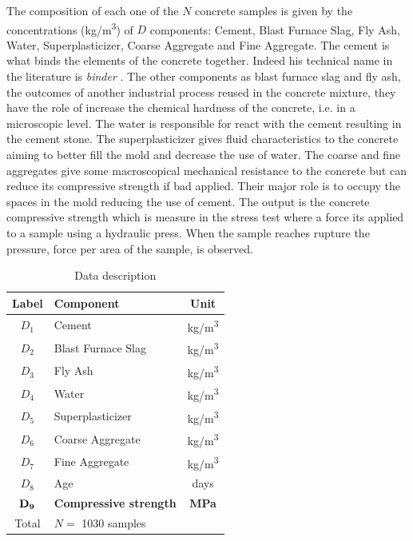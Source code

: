 \documentclass[conference]{IEEEtran}
\begin{document}
The composition of each one of the $N$ concrete samples is given by the concentrations (kg/m\textsuperscript{3}) of $D$ components: Cement, Blast Furnace Slag, Fly Ash, Water, Superplasticizer, Coarse Aggregate and Fine Aggregate. The cement is what binds the elements of the concrete together. Indeed his technical name in the literature is \emph{binder} \cite{b5}. The other components as blast furnace slag and fly ash, the outcomes of another industrial process reused in the concrete mixture, they have the role of increase the chemical hardness of the concrete, i.e. in a microscopic level. The water is responsible for react with the cement resulting in the cement stone. The superplasticizer gives fluid characteristics to the concrete aiming to better fill the mold and decrease the use of water. The coarse and fine aggregates give some macroscopical mechanical resistance to the concrete but can reduce its compressive strength if bad applied. Their major role is to occupy the spaces in the mold reducing the use of cement. The output is the concrete compressive strength which is measure in the stress test where a force its applied to a sample using a hydraulic press. When the sample reaches rupture the pressure, force per area of the sample, is observed.


\begin{table}[htp]
\caption{Data description}
\begin{center}
  \begin{tabular}{@{} clc @{}}
    \toprule
    Label & Component & Unit \\ 
    \midrule
    $D_1$ & Cement & kg/m\textsuperscript{3} \\ 
    $D_2$ & Blast Furnace Slag & kg/m\textsuperscript{3} \\ 
    $D_3$ & Fly Ash & kg/m\textsuperscript{3} \\ 
    $D_4$ & Water & kg/m\textsuperscript{3} \\ 
    $D_5$ & Superplasticizer & kg/m\textsuperscript{3} \\ 
    $D_6$ & Coarse Aggregate & kg/m\textsuperscript{3} \\ 
    $D_7$ & Fine Aggregate & kg/m\textsuperscript{3} \\ 
    $D_8$ & Age & days \\ 
    ${\bf D_9}$ & {\bf Compressive strength} & {\bf MPa} \\ 
	\midrule
    Total & $N=$ 1030 samples&  \\ 
    \bottomrule
  \end{tabular}
\end{center}
\label{data_description_table}
\end{table}%
\end{document}
